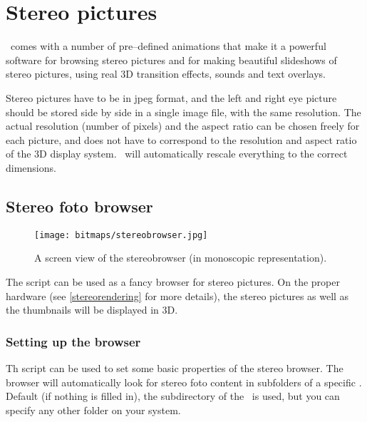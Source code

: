 \chapter{Stereo pictures}

\softwarename\ comes with a number of pre--defined animations that make it a powerful software for browsing stereo pictures and for making beautiful slideshows of stereo pictures, using real 3D transition effects, sounds and text overlays.

Stereo pictures have to be in jpeg format, and the left and right eye picture should be stored side by side in a single image file, with the same resolution. The actual resolution (number of pixels) and the aspect ratio can be chosen freely for each picture, and does not have to correspond to the resolution and aspect ratio of the 3D display system. \softwarename\ will automatically rescale everything to the correct dimensions.


\section{Stereo foto browser}

\begin{figure}
\texttt{[image: bitmaps/stereobrowser.jpg]}
\caption{A screen view of the stereobrowser (in monoscopic representation).}
\label{stereobrowser}
\end{figure}


The script  can be used as a fancy browser for stereo pictures. On the proper hardware (see \ref{stereorendering} for more details), the stereo pictures as well as the thumbnails will be displayed in 3D.


\subsection{Setting up the browser}

Th script  can be used to set some basic properties of the stereo browser. The browser will automatically look for stereo foto content in subfolders of a specific . Default (if nothing is filled in), the subdirectory  of the \datadir\ is used, but you can specify any other folder on your system.

